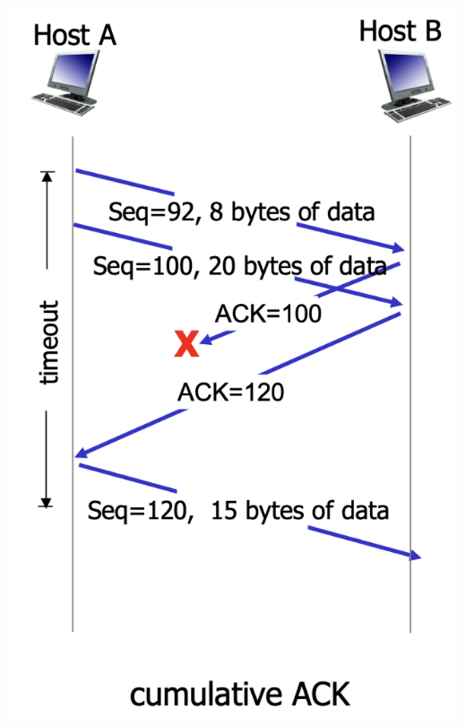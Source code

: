 \documentclass{article}
\begin{document}
\begin{multicols*}{3}
\includegraphics[scale=0.23]{tcp-retransmission2}


\end{multicols*}
\end{document}

